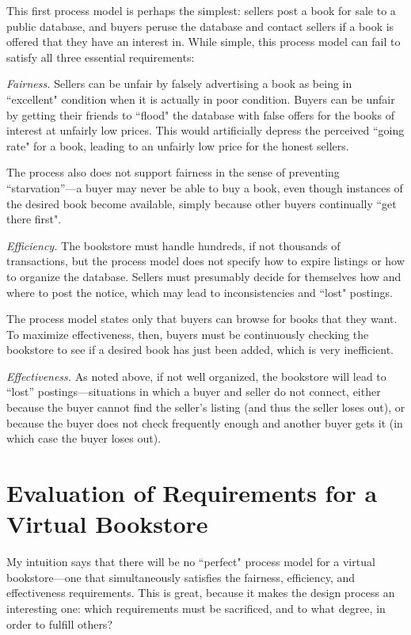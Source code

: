 This first process model is perhaps the simplest: sellers post a book for
sale to a public database, and buyers peruse the database and contact
sellers if a book is offered that they have an interest in.  While simple,
this process model can fail to satisfy all three essential requirements:

{\em Fairness.} Sellers can be unfair by falsely advertising a book
as being in ``excellent" condition when it is actually in poor
condition.  Buyers can be unfair by getting their friends to ``flood"
the database with false offers for the books of interest at unfairly
low prices.  This would artificially depress the perceived ``going
rate" for a book, leading to an unfairly low price for the honest
sellers.

The process also does not support fairness in the sense of
preventing ``starvation''---a buyer may never be able to buy a book,
even though instances of the desired book become available, simply
because other buyers continually ``get there first".

{\em Efficiency.} The bookstore must handle hundreds, if not thousands of
transactions, but the process model does not specify how to expire listings
or how to organize the database.  Sellers must presumably decide for
themselves how and where to post the notice, which may lead to
inconsistencies and ``lost" postings.

The process model states only that buyers can browse for books that they
want.  To maximize effectiveness, then, buyers must be continuously
checking the bookstore to see if a desired book has just been added, which
is very inefficient.

{\em Effectiveness.} As noted above, if not well organized, the
bookstore will lead to ``lost'' postings---situations in which a buyer
and seller do not connect, either because the buyer cannot find the
seller's listing (and thus the seller loses out), or because the
buyer does not check frequently enough and another buyer gets it (in
which case the buyer loses out).

\section{Evaluation of Requirements for a Virtual Bookstore} 

My intuition says that there will be no ``perfect" process model for a
virtual bookstore---one that simultaneously satisfies the fairness,
efficiency, and effectiveness requirements.  This is great, because it
makes the design process an interesting one: which requirements must be
sacrificed, and to what degree, in order to fulfill others?  

